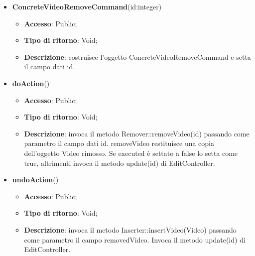 {{{	
	\begin{itemize}
		\item \textbf{ConcreteVideoRemoveCommand}(id:integer)
		\begin{itemize}
			\item \textbf{Accesso}: Public;
			\item \textbf{Tipo di ritorno}: Void;
			\item \textbf{Descrizione}: costruisce l’oggetto ConcreteVideoRemoveCommand e setta il campo dati id.
		\end{itemize}
		\item \textbf{doAction}()
		\begin{itemize}
			\item \textbf{Accesso}: Public;
			\item \textbf{Tipo di ritorno}: Void;
			\item \textbf{Descrizione}: invoca il metodo Remover::removeVideo(id) passando come parametro il campo dati id. removeVideo restituisce una copia dell’oggetto Video rimosso. Se executed è settato a false lo setta come true, altrimenti invoca il metodo update(id) di EditController.
		\end{itemize}
		\item \textbf{undoAction}()
		\begin{itemize}
			\item \textbf{Accesso}: Public;
			\item \textbf{Tipo di ritorno}: Void;
			\item \textbf{Descrizione}: invoca il metodo Inserter::insertVideo(Video) passando come parametro il campo removedVideo. Invoca il metodo update(id) di EditController.
		\end{itemize}
	\end{itemize}
	}
}}

